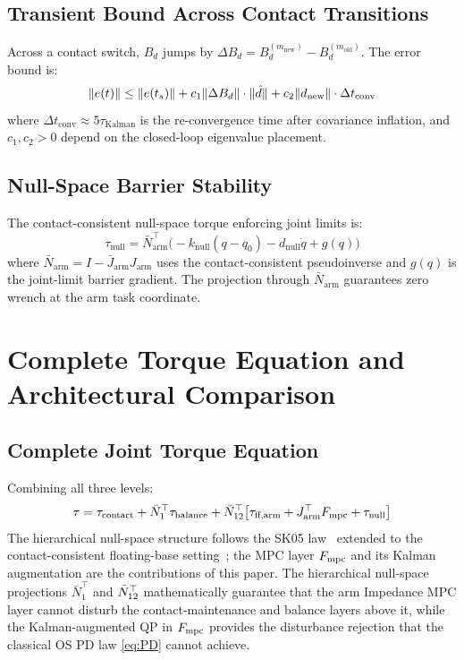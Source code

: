 \subsection{Transient Bound Across Contact Transitions}

Across a contact switch, $B_d$ jumps by
$\Delta B_d=B_d^{(m_{\text{new}})}-B_d^{(m_{\text{old}})}$.
The error bound is:
\begin{equation}\label{eq:transient}
  \|e(t)\| \leq \|e(t_s)\|
    + c_1\|\Delta B_d\|\cdot\|\hat{d}\|
    + c_2\|d_{\text{new}}\|\cdot\Delta t_{\text{conv}}
\end{equation}
where $\Delta t_{\text{conv}}\approx5\tau_{\text{Kalman}}$ is the
re-convergence time after covariance inflation, and $c_1,c_2>0$ depend on
the closed-loop eigenvalue placement.

\subsection{Null-Space Barrier Stability}

The contact-consistent null-space torque enforcing joint limits is:
\begin{equation}\label{eq:null}
  \tau_{\text{null}}
    = \bar{N}_{\text{arm}}^\top\bigl(-k_{\text{null}}(q-q_0)
      -d_{\text{null}}\dot{q}+g(q)\bigr)
\end{equation}
where $\bar{N}_{\text{arm}}=I-\bar{J}_{\text{arm}}J_{\text{arm}}$ uses the
contact-consistent pseudoinverse and $g(q)$ is the joint-limit barrier
gradient.
The projection through $\bar{N}_{\text{arm}}$ guarantees zero wrench at the
arm task coordinate.

\section{Complete Torque Equation and Architectural Comparison}
\label{sec:torque}

\subsection{Complete Joint Torque Equation}

Combining all three levels:
\begin{equation}\label{eq:fulltorque}
  \tau = \tau_{\text{contact}}
       + \bar{N}_1^\top\tau_{\text{balance}}
       + \bar{N}_{12}^\top\bigl[\tau_{\text{ff,arm}}
         + J_{\text{arm}}^\top F_{\text{mpc}} + \tau_{\text{null}}\bigr]
\end{equation}
The hierarchical null-space structure follows the SK05
law~\cite{sentis2005synthesis} extended to the contact-consistent
floating-base setting~\cite{khatib1987unified,righetti2011inverse}; the MPC
layer $F_{\text{mpc}}$ and its Kalman augmentation are the contributions of this
paper. The hierarchical null-space projections $\bar{N}_1^\top$ and
$\bar{N}_{12}^\top$ mathematically guarantee that the arm Impedance MPC layer
cannot disturb the contact-maintenance and balance layers above it, while
the Kalman-augmented QP in $F_{\text{mpc}}$ provides the disturbance rejection that
the classical OS PD law \eqref{eq:PD} cannot achieve.

